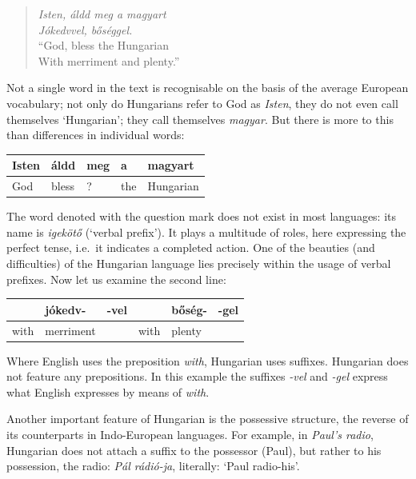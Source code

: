 \begin{multicols}{2}
\begin{verse}

\textit{Isten, áldd meg a magyart}\\
\textit{Jókedvvel, bőséggel.}\\
"`God, bless the Hungarian\\
With merriment and plenty."'
\end{verse}    

Not a single word in the text is recognisable on the basis of the average European vocabulary; not only do Hungarians refer to God as \textit{Isten}, they do not even call themselves `Hungarian'; they call themselves \textit{magyar}. But there is more to this than differences in individual words:

\vspace{3mm}

\begin{tabular}{l|l|l|l|l}
    Isten & áldd & meg & a & magyart\\
    \hline
    God & bless & ? & the & Hungarian\\
  \end{tabular}

\vspace{3mm} 

The word denoted with the question mark does not exist in most languages: its name is \textit{igekötő} (`verbal prefix'). It plays a multitude of roles, here expressing the perfect tense, i.e.~it indicates a completed action. One of the beauties (and difficulties) of the Hungarian language lies precisely within the usage of verbal prefixes. Now let us examine the second line:

 \vspace{3mm}

\begin{tabular}{l|l|l|l|l|l}
    & jókedv- & -vel & & bőség- & -gel\\
    \hline
    with & merriment & & with & plenty & \\
  \end{tabular}

\vspace{3mm}  

Where English uses the preposition \textit{with}, Hungarian uses suffixes. Hungarian does not feature any prepositions. In this example the suffixes \textit{-vel} and \textit{-gel} express what English expresses by means of \textit{with}. 

Another important feature of Hungarian is the possessive structure, the reverse of its counterparts in Indo-European languages. For example, in \textit{Paul's radio}, Hungarian does not attach a suffix to the possessor (Paul), but rather to his possession, the radio: \textit{Pál rádió-ja}, literally: `Paul radio-his'. 


\end{multicols}
